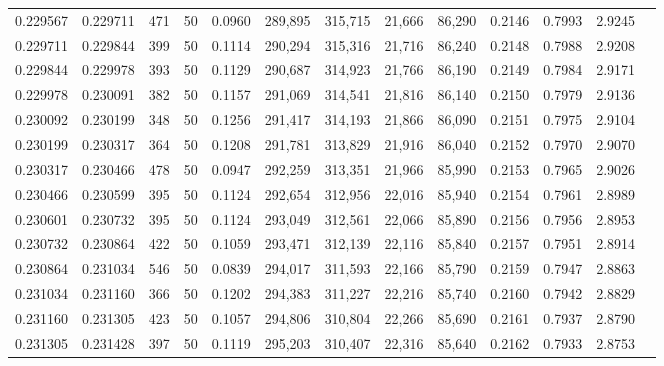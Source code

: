 \begin{tabular}{rrrrrrrrrrrrr}
0.229567 & 0.229711 &   471 &  50 &                                     0.0960 & 289,895 & 315,715 &  21,666 &  86,290 & 0.2146 & 0.7993 & 2.9245 \\
0.229711 & 0.229844 &   399 &  50 &                                     0.1114 & 290,294 & 315,316 &  21,716 &  86,240 & 0.2148 & 0.7988 & 2.9208 \\
0.229844 & 0.229978 &   393 &  50 &                                     0.1129 & 290,687 & 314,923 &  21,766 &  86,190 & 0.2149 & 0.7984 & 2.9171 \\
0.229978 & 0.230091 &   382 &  50 &                                     0.1157 & 291,069 & 314,541 &  21,816 &  86,140 & 0.2150 & 0.7979 & 2.9136 \\
0.230092 & 0.230199 &   348 &  50 &                                     0.1256 & 291,417 & 314,193 &  21,866 &  86,090 & 0.2151 & 0.7975 & 2.9104 \\
0.230199 & 0.230317 &   364 &  50 &                                     0.1208 & 291,781 & 313,829 &  21,916 &  86,040 & 0.2152 & 0.7970 & 2.9070 \\
0.230317 & 0.230466 &   478 &  50 &                                     0.0947 & 292,259 & 313,351 &  21,966 &  85,990 & 0.2153 & 0.7965 & 2.9026 \\
0.230466 & 0.230599 &   395 &  50 &                                     0.1124 & 292,654 & 312,956 &  22,016 &  85,940 & 0.2154 & 0.7961 & 2.8989 \\
0.230601 & 0.230732 &   395 &  50 &                                     0.1124 & 293,049 & 312,561 &  22,066 &  85,890 & 0.2156 & 0.7956 & 2.8953 \\
0.230732 & 0.230864 &   422 &  50 &                                     0.1059 & 293,471 & 312,139 &  22,116 &  85,840 & 0.2157 & 0.7951 & 2.8914 \\
0.230864 & 0.231034 &   546 &  50 &                                     0.0839 & 294,017 & 311,593 &  22,166 &  85,790 & 0.2159 & 0.7947 & 2.8863 \\
0.231034 & 0.231160 &   366 &  50 &                                     0.1202 & 294,383 & 311,227 &  22,216 &  85,740 & 0.2160 & 0.7942 & 2.8829 \\
0.231160 & 0.231305 &   423 &  50 &                                     0.1057 & 294,806 & 310,804 &  22,266 &  85,690 & 0.2161 & 0.7937 & 2.8790 \\
0.231305 & 0.231428 &   397 &  50 &                                     0.1119 & 295,203 & 310,407 &  22,316 &  85,640 & 0.2162 & 0.7933 & 2.8753 \\

\end{tabular}
